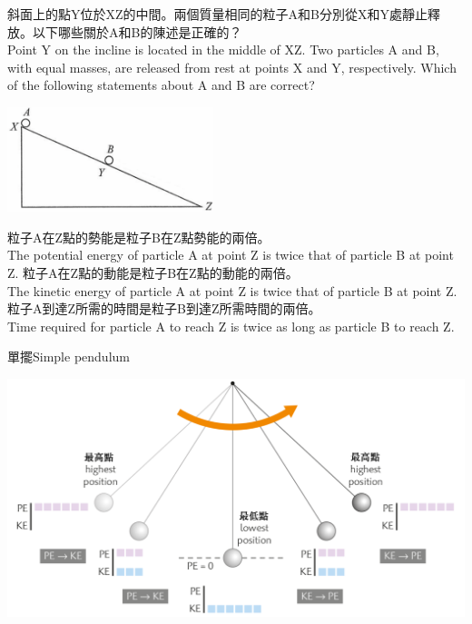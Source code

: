 \documentclass[beamer=true]{standalone}
\begin{document}
\begin{eg}
    斜面上的點Y位於XZ的中間。兩個質量相同的粒子A和B分別從X和Y處靜止釋放。以下哪些關於A和B的陳述是正確的？\\Point Y on the incline is located in the middle of XZ. Two particles A and B, with equal masses, are released from rest at points X and Y, respectively. Which of the following statements about A and B are correct?\bigskip
    {\par\centering
        \includegraphics[width=0.45\textwidth]{assets/7f1967a5.png}
        \par}
\end{eg}
\begin{eg}

    \begin{statements}
        \task 粒子A在Z點的勢能是粒子B在Z點勢能的兩倍。\\The potential energy of particle A at point Z is twice that of particle B at point Z.
        \task 粒子A在Z點的動能是粒子B在Z點的動能的兩倍。\\The kinetic energy of particle A at point Z is twice that of particle B at point Z.
        \task 粒子A到達Z所需的時間是粒子B到達Z所需時間的兩倍。\\Time required for particle A to reach Z is twice as long as particle B to reach Z.
    \end{statements}
\end{eg}

\begin{frame}{單擺Simple pendulum}
    \par
    {\par\centering
        \includegraphics[width=\textwidth]{assets/76d2fb7c.png}
        \par}
\end{frame}
\end{document}
